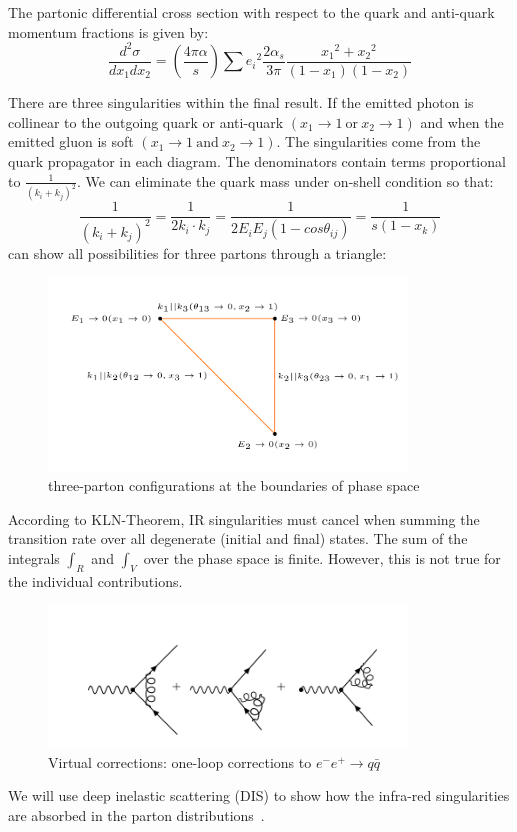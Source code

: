 The partonic differential cross section with respect to the quark and anti-quark momentum fractions is given by:
\begin{equation}
\frac{d^2 \sigma}{dx_1 dx_2}= (\frac{4\pi \alpha}{s})\sum {e_i}^2 
\frac{2\alpha_s}{3\pi} \frac{{x_1}^2+{x_2}^2}{(1-x_1)(1-x_2)}
\end{equation}

There are three singularities within the final result. 
If the emitted photon is collinear to the outgoing quark or anti-quark $ (x_1 \rightarrow 1 \:\text{or}\: x_2 \rightarrow 1) $ and when the emitted gluon is soft $ (x_1 \rightarrow 1\: \text{and}\: x_2 \rightarrow 1 )$.
The singularities come from the quark propagator in each diagram. The denominators contain terms proportional to $ \frac{1}{(k_i + k_j)^2}  $. We can eliminate the quark mass under on-shell condition so that:
\begin{equation}
\frac{1}{(k_i + k_j)^2}=\frac{1}{2k_i \cdot k_j}=\frac{1}{2E_iE_j(1-cos\theta_{ij})}=\frac{1}{s(1- x_k)}
\end{equation} 
can show all possibilities for three partons through a triangle:

\begin{figure}[h!]
\centering
\includegraphics[width=0.85\textwidth]{images/Intro/triangle.png}
\caption{three-parton configurations at the boundaries
of phase space}
\end{figure}

According to KLN-Theorem, IR singularities must cancel when summing the transition rate over all degenerate (initial and final) states.
The sum of the integrals $ \int_R $ and $ \int_V $ over the phase space is finite. However, this is not true for the
individual contributions.
\begin{figure}[ht!]
\centering
\includegraphics[width=0.85\textwidth]{images/Intro/virtual.png}
\caption{Virtual corrections: one-loop corrections to $  e^- e^+ \rightarrow q\bar{q} $}
\end{figure}
We will use deep inelastic scattering (DIS) to show how the infra-red singularities are absorbed in the parton distributions~\cite{Cunha13}.

